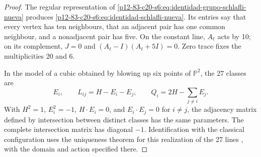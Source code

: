 \begin{proof}
The regular representation of
\cref{p12-83-c20-s6:eq:identidad-grupo-schlafli-nueva} produces
\cref{p12-83-c20-s6:eq:identidad-schlafli-nueva}. Its entries say that every vertex
has ten neighbours, that an adjacent pair has one common neighbour, and a nonadjacent
pair has five. On the constant line, \(A_\ell\) acts by 10;
on its complement, \(J=0\) and
\((A_\ell-I)(A_\ell+5I)=0\). Zero trace fixes the multiplicities 20 and 6.

In the model of a cubic obtained by blowing up six points of
\(\mathbb P^2\), the 27 classes are
\[
 E_i,\qquad L_{ij}=H-E_i-E_j,\qquad
 Q_i=2H-\sum_{j\ne i}E_j.
\]
With \(H^2=1\), \(E_i^2=-1\), \(H\cdot E_i=0\), and
\(E_i\cdot E_j=0\) for \(i\ne j\), the adjacency matrix defined
by intersection between distinct classes has the same parameters.
The complete intersection matrix has diagonal \(-1\).
Identification with the classical configuration uses the
uniqueness theorem for this realization of the 27 lines
\cite{Manivel2005}, with the domain and action specified there.
\end{proof}

